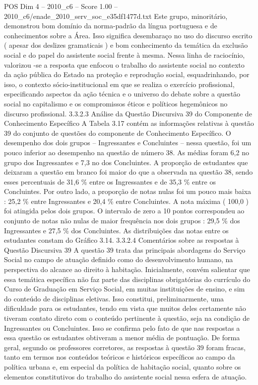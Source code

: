 \begin{textsample}{POS Dim 4 – 2010\_c6 – Score 1.00 – 2010\_c6/enade\_2010\_serv\_soc\_e35df1477d.txt}
Este grupo, minoritário, demonstrou bom domínio da norma-padrão da língua portuguesa e de conhecimentos sobre a Área.
Isso significa desembaraço no uso do discurso escrito ( apesar dos deslizes gramaticais ) e bom conhecimento da temática da exclusão social e do papel do assistente social frente à mesma.
Nessa linha de raciocínio, valorizou -se a resposta que enfocou o trabalho do assistente social no contexto da ação pública do Estado na proteção e reprodução social, esquadrinhando, por isso, o contexto sócio-institucional em que se realiza o exercício profissional, especificando aspectos da ação técnica e o universo do debate sobre a questão social no capitalismo e os compromissos éticos e políticos hegemônicos no discurso profissional. 3.3.2.3 Análise da Questão Discursiva 39 do Componente de Conhecimento Específico A Tabela 3.17 contém as informações relativas à questão 39 do conjunto de questões do componente de Conhecimento Específico.
O desempenho dos dois grupos – Ingressantes e Concluintes – nessa questão, foi um pouco inferior ao desempenho na questão de número 38.
As médias foram 6,2 no grupo dos Ingressantes e 7,3 no dos Concluintes.
A proporção de estudantes que deixaram a questão em branco foi maior do que a observada na questão 38, sendo esses percentuais de 31,6 \% entre os Ingressantes e de 35,3 \% entre os Concluintes.
Por outro lado, a proporção de notas nulas foi um pouco mais baixa : 25,2 \% entre Ingressantes e 20,4 \% entre Concluintes.
A nota máxima ( 100,0 ) foi atingida pelos dois grupos.
O intervalo de zero a 10 pontos correspondeu ao conjunto de notas não nulas de maior frequência nos dois grupos : 29,5 \% dos Ingressantes e 27,5 \% dos Concluintes.
As distribuições das notas entre os estudantes constam do Gráfico 3.14. 3.3.2.4 Comentários sobre as respostas à Questão Discursiva 39 A questão 39 trata das principais abordagens do Serviço Social no campo de atuação definido como do desenvolvimento humano, na perspectiva do alcance ao direito à habitação.
Inicialmente, convém salientar que essa temática específica não faz parte das disciplinas obrigatórias do currículo do Curso de Graduação em Serviço Social, em muitas instituições de ensino, e sim do conteúdo de disciplinas eletivas.
Isso constitui, preliminarmente, uma dificuldade para os estudantes, tendo em vista que muitos deles certamente não tiveram contato direto com o conteúdo pertinente à questão, seja na condição de Ingressantes ou Concluintes.
Isso se confirma pelo fato de que nas respostas a essa questão os estudantes obtiveram a menor média de pontuação.
De forma geral, segundo os professores corretores, as respostas à questão 39 foram fracas, tanto em termos nos conteúdos teóricos e históricos específicos ao campo da política urbana e, em especial da política de habitação social, quanto sobre os elementos constitutivos do trabalho do assistente social nessa esfera de atuação.

\end{textsample}
